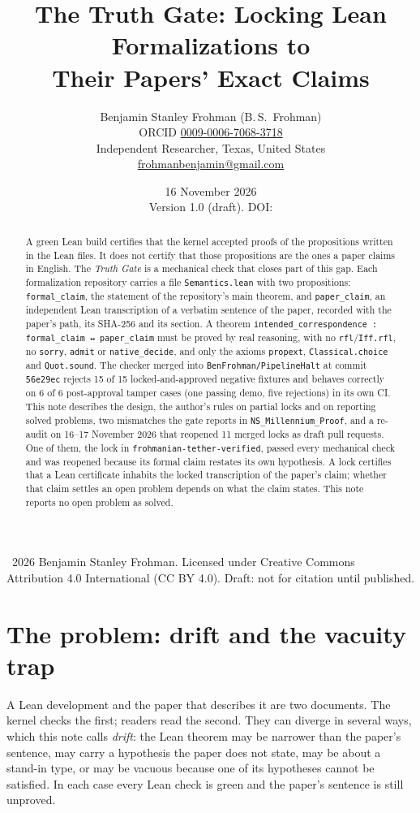 \documentclass[11pt,a4paper]{article}
\title{The Truth Gate: Locking Lean Formalizations to\\ Their Papers' Exact Claims}
\author{Benjamin Stanley Frohman (B.\,S.\ Frohman)\\
\small ORCID \href{https://orcid.org/0009-0006-7068-3718}{0009-0006-7068-3718}\\
\small Independent Researcher, Texas, United States\\
\small \href{mailto:frohmanbenjamin@gmail.com}{frohmanbenjamin@gmail.com}}
\date{16 November 2026\\[2pt]\small Version 1.0 (draft). DOI: \reserveddoi}
\newcommand{\code}[1]{\texttt{#1}}
\begin{document}
\maketitle

\begin{abstract}
A green Lean build certifies that the kernel accepted proofs of the propositions written in the
Lean files. It does not certify that those propositions are the ones a paper claims in English.
The \emph{Truth Gate} is a mechanical check that closes part of this gap. Each formalization
repository carries a file \code{Semantics.lean} with two propositions: \code{formal\_claim}, the
statement of the repository's main theorem, and \code{paper\_claim}, an independent Lean
transcription of a verbatim sentence of the paper, recorded with the paper's path, its SHA-256
and its section. A theorem \code{intended\_correspondence : formal\_claim ↔ paper\_claim} must be
proved by real reasoning, with no \code{rfl}/\code{Iff.rfl}, no \code{sorry}, \code{admit} or
\code{native\_decide}, and only the axioms \code{propext}, \code{Classical.choice} and
\code{Quot.sound}. The checker merged into \code{BenFrohman/PipelineHalt} at commit
\code{56e29ec} rejects 15 of 15 locked-and-approved negative fixtures and behaves correctly on
6 of 6 post-approval tamper cases (one passing demo, five rejections) in its own CI. This note
describes the design, the author's rules on partial locks and on reporting solved problems, two
mismatches the gate reports in \code{NS\_Millennium\_Proof}, and a re-audit on 16--17 November
2026 that reopened 11 merged locks as draft pull requests. One of them, the lock in
\code{frohmanian-tether-verified}, passed every mechanical check and was reopened because its
formal claim restates its own hypothesis. A lock certifies that a Lean certificate inhabits the
locked transcription of the paper's claim; whether that claim settles an open problem depends on
what the claim states. This note reports no open problem as solved.
\end{abstract}

\noindent\small\textcopyright\ 2026 Benjamin Stanley Frohman. Licensed under Creative Commons
Attribution 4.0 International (CC BY 4.0). Draft: not for citation until published.\normalsize

\section{The problem: drift and the vacuity trap}

A Lean development and the paper that describes it are two documents. The kernel checks the
first; readers read the second. They can diverge in several ways, which this note calls
\emph{drift}: the Lean theorem may be narrower than the paper's sentence, may carry a
hypothesis the paper does not state, may be about a stand-in type, or may be vacuous because one
of its hypotheses cannot be satisfied. In each case every Lean check is green and the paper's
sentence is still unproved.
\end{document}

